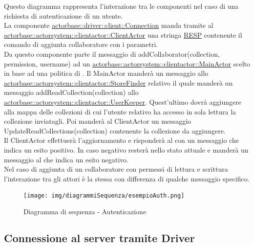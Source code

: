 \documentclass{scalatekids-article}
\begin{document}
Questo diagramma rappresenta l'interazione tra le componenti nel caso di una richiesta di autenticazione di un utente.\\
La componente \hyperref[sec:actorbase::driver::client::Connection]{actorbase::driver::client::Connection}
manda tramite  al \hyperref[sec:actorbase::actorsystem::clientactor::ClientActor]{actorbase::actorsystem::clientactor::ClientActor}
una stringa \hyperref[sec:RESP]{RESP} contenente il comando di aggiunta collaboratore  con
i parametri.\\
Da questo componente parte il messaggio di addCollaborator(collection, permission, username) ad un \hyperref[sec:actorbase::actorsystem::clientactor::MainActor]{actorbase::actorsystem::clientactor::MainActor} scelto in base ad una
politica di . Il MainActor manderà un messaggio allo
\hyperref[sec:actorbase::actorsystem::clientactor::StoreFinder]{actorbase::actorsystem::clientactor::StoreFinder}
relativo il quale manderà un messaggio addReadCollection(collection) allo
\hyperref[sec:actorbase::actorsystem::clientactor::UserKeeper]{actorbase::actorsystem::clientactor::UserKeeper}.
Quest'ultimo dovrà aggiungere alla mappa delle collezioni di cui l'utente
relativo ha accesso in sola lettura la collezione inviatagli.
Poi manderà al ClientActor un messaggio UpdateReadCollections(collection)
contenente la collezione da aggiungere.\\
Il ClientActor effettuerà l'aggiornamento e risponderà al 
con un messaggio che indica un esito positivo. In caso negativo resterà nello
stato attuale e manderà un messaggio al  che indica un esito
negativo.\\
Nel caso di aggiunta di un collaboratore con permessi di lettura e scrittura
l'interazione tra gli attori è la stessa con differenza di qualche messaggio
specifico.\\
\begin{figure}[H]
  \begin{center}
    \texttt{[image: img/diagrammiSequenza/esempioAuth.png]}
    \caption{Diagramma di sequenza - Autenticazione}
  \end{center}
\end{figure}

\subsection{Connessione al server tramite Driver}
\end{document}
